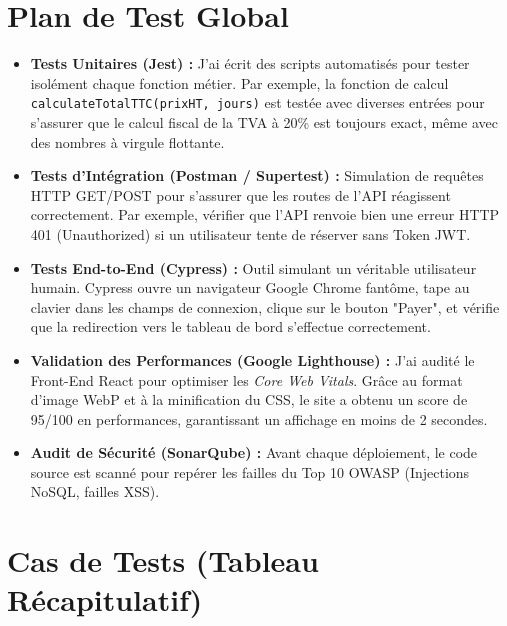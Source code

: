 \documentclass[12pt, a4paper]{report}
\begin{document}
\section{Plan de Test Global}
\begin{itemize}
    \item \textbf{Tests Unitaires (Jest) :} J'ai écrit des scripts automatisés pour tester isolément chaque fonction métier. Par exemple, la fonction de calcul \texttt{calculateTotalTTC(prixHT, jours)} est testée avec diverses entrées pour s'assurer que le calcul fiscal de la TVA à 20\% est toujours exact, même avec des nombres à virgule flottante.
    \item \textbf{Tests d'Intégration (Postman / Supertest) :} Simulation de requêtes HTTP GET/POST pour s'assurer que les routes de l'API réagissent correctement. Par exemple, vérifier que l'API renvoie bien une erreur HTTP 401 (Unauthorized) si un utilisateur tente de réserver sans Token JWT.
    \item \textbf{Tests End-to-End (Cypress) :} Outil simulant un véritable utilisateur humain. Cypress ouvre un navigateur Google Chrome fantôme, tape au clavier dans les champs de connexion, clique sur le bouton "Payer", et vérifie que la redirection vers le tableau de bord s'effectue correctement.
    \item \textbf{Validation des Performances (Google Lighthouse) :} J'ai audité le Front-End React pour optimiser les \textit{Core Web Vitals}. Grâce au format d'image WebP et à la minification du CSS, le site a obtenu un score de 95/100 en performances, garantissant un affichage en moins de 2 secondes.
    \item \textbf{Audit de Sécurité (SonarQube) :} Avant chaque déploiement, le code source est scanné pour repérer les failles du Top 10 OWASP (Injections NoSQL, failles XSS).
\end{itemize}

\section{Cas de Tests (Tableau Récapitulatif)}
\end{document}
